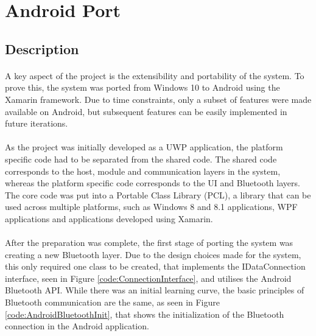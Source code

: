 \section{Android Port}
	\subsection{Description}		
		\paragraph{}{
		A key aspect of the project is the extensibility and portability of the system. To prove this, the system was ported from Windows 10 to Android using the Xamarin framework. Due to time constraints, only a subset of features were made available on Android, but subsequent features can be easily implemented in future iterations.
		}
		\paragraph{}{
		As the project was initially developed as a UWP application, the platform specific code had to be separated from the shared code. The shared code corresponds to the host, module and communication layers in the system, whereas the platform specific code corresponds to the UI and Bluetooth layers. The core code was put into a Portable Class Library (PCL), a library that can be used across multiple platforms, such as Windows 8 and 8.1 applications, WPF applications and applications developed using Xamarin.
		}
		
		\paragraph{}{
		After the preparation was complete, the first stage of porting the system was creating a new Bluetooth layer. Due to the design choices made for the system, this only required one class to be created, that implements the IDataConnection interface, seen in Figure \ref{code:ConnectionInterface}, and utilises the Android Bluetooth API. While there was an initial learning curve, the basic principles of Bluetooth communication are the same, as seen in Figure \ref{code:AndroidBluetoothInit}, that shows the initialization of the Bluetooth connection in the Android application.
		}
		
